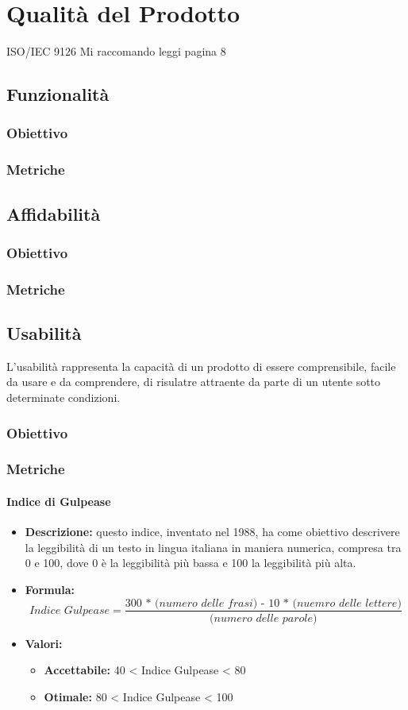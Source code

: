 \section{Qualità del Prodotto}
ISO/IEC 9126
Mi raccomando leggi pagina 8

\subsection{Funzionalità}
\subsubsection{Obiettivo}
\subsubsection{Metriche}
\subsection{Affidabilità}
\subsubsection{Obiettivo}
\subsubsection{Metriche}
\subsection{Usabilità}
L'usabilità rappresenta la capacità di un prodotto di essere comprensibile, facile da usare e da comprendere, di risulatre attraente da parte di un utente sotto determinate condizioni.
\subsubsection{Obiettivo}
\subsubsection{Metriche}
\paragraph{Indice di Gulpease}
\begin{itemize}
\item \textbf{Descrizione:} questo indice, inventato nel 1988, ha come obiettivo descrivere la leggibilità di un testo in lingua italiana in maniera numerica, compresa tra 0 e 100, dove 0 è la leggibilità più bassa e 100 la leggibilità più alta. 
\item \textbf{Formula:} \[\textit{Indice Gulpease} = \frac{\textit{300 * (numero delle frasi) - 10 * (nuemro delle lettere)}}{\textit{(numero delle parole)}}\]
\item \textbf{Valori:}
    \begin{itemize}
        \item \textbf{Accettabile:} 40 < Indice Gulpease < 80
        \item \textbf{Otimale:} 80 < Indice Gulpease < 100
    \end{itemize}
\end{itemize}
